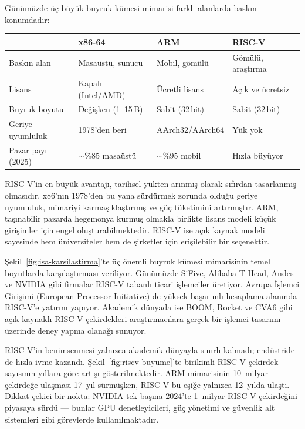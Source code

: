 \begin{karsilastirma}
Günümüzde üç büyük buyruk kümesi mimarisi farklı alanlarda baskın konumdadır:

\begin{center}
\small
\begin{tabular}{lp{3cm}p{3cm}p{3cm}}
\toprule
 & \textbf{x86-64} & \textbf{ARM} & \textbf{RISC-V} \\
\midrule
Baskın alan & Masaüstü, sunucu & Mobil, gömülü & Gömülü, araştırma \\
Lisans & Kapalı (Intel/AMD) & Ücretli lisans & Açık ve ücretsiz \\
Buyruk boyutu & Değişken (1--15\,B) & Sabit (32\,bit) & Sabit (32\,bit) \\
Geriye uyumluluk & 1978'den beri & AArch32/AArch64 & Yük yok \\
Pazar payı (2025) & $\sim$\%85 masaüstü & $\sim$\%95 mobil & Hızla büyüyor \\
\bottomrule
\end{tabular}
\end{center}

RISC-V'in en büyük avantajı, tarihsel yükten arınmış olarak sıfırdan tasarlanmış olmasıdır. x86'nın 1978'den bu yana sürdürmek zorunda olduğu geriye uyumluluk, mimariyi karmaşıklaştırmış ve güç tüketimini artırmıştır. ARM, taşınabilir pazarda hegemonya kurmuş olmakla birlikte lisans modeli küçük girişimler için engel oluşturabilmektedir. RISC-V ise açık kaynak modeli sayesinde hem üniversiteler hem de şirketler için erişilebilir bir seçenektir.
\end{karsilastirma}

Şekil~\ref{fig:isa-karsilastirma}'te üç önemli buyruk kümesi mimarisinin temel boyutlarda karşılaştırması veriliyor. Günümüzde SiFive, Alibaba T-Head, Andes ve NVIDIA gibi firmalar RISC-V tabanlı ticari işlemciler üretiyor. Avrupa İşlemci Girişimi (European Processor Initiative) de yüksek başarımlı hesaplama alanında RISC-V'e yatırım yapıyor. Akademik dünyada ise BOOM, Rocket ve CVA6 gibi açık kaynaklı RISC-V çekirdekleri araştırmacılara gerçek bir işlemci tasarımı üzerinde deney yapma olanağı sunuyor.

RISC-V'in benimsenmesi yalnızca akademik dünyayla sınırlı kalmadı; endüstride de hızla ivme kazandı. Şekil~\ref{fig:riscv-buyume}'te birikimli RISC-V çekirdek sayısının yıllara göre artışı gösterilmektedir. ARM mimarisinin 10~milyar çekirdeğe ulaşması 17~yıl sürmüşken, RISC-V bu eşiğe yalnızca 12~yılda ulaştı. Dikkat çekici bir nokta: NVIDIA tek başına 2024'te 1~milyar RISC-V çekirdeğini piyasaya sürdü --- bunlar GPU denetleyicileri, güç yönetimi ve güvenlik alt sistemleri gibi görevlerde kullanılmaktadır.


